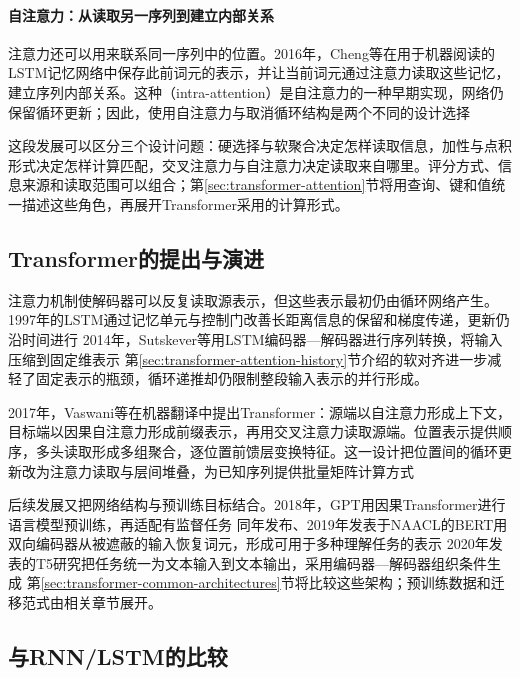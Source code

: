 \paragraph{自注意力：从读取另一序列到建立内部关系}
注意力还可以用来联系同一序列中的位置。2016年，Cheng等在用于机器阅读的LSTM记忆网络中保存此前词元的表示，并让当前词元通过注意力读取这些记忆，建立序列内部关系。这种（intra-attention）是自注意力的一种早期实现，网络仍保留循环更新；因此，使用自注意力与取消循环结构是两个不同的设计选择

这段发展可以区分三个设计问题：硬选择与软聚合决定怎样读取信息，加性与点积形式决定怎样计算匹配，交叉注意力与自注意力决定读取来自哪里。评分方式、信息来源和读取范围可以组合；第\ref{sec:transformer-attention}节将用查询、键和值统一描述这些角色，再展开Transformer采用的计算形式。

\subsection{Transformer的提出与演进}
\label{sec:transformer-architecture-history}

注意力机制使解码器可以反复读取源表示，但这些表示最初仍由循环网络产生。1997年的LSTM通过记忆单元与控制门改善长距离信息的保留和梯度传递，更新仍沿时间进行 2014年，Sutskever等用LSTM编码器—解码器进行序列转换，将输入压缩到固定维表示 第\ref{sec:transformer-attention-history}节介绍的软对齐进一步减轻了固定表示的瓶颈，循环递推却仍限制整段输入表示的并行形成。

2017年，Vaswani等在机器翻译中提出Transformer：源端以自注意力形成上下文，目标端以因果自注意力形成前缀表示，再用交叉注意力读取源端。位置表示提供顺序，多头读取形成多组聚合，逐位置前馈层变换特征。这一设计把位置间的循环更新改为注意力读取与层间堆叠，为已知序列提供批量矩阵计算方式

\Needspace{165mm}
后续发展又把网络结构与预训练目标结合。2018年，GPT用因果Transformer进行语言模型预训练，再适配有监督任务 同年发布、2019年发表于NAACL的BERT用双向编码器从被遮蔽的输入恢复词元，形成可用于多种理解任务的表示 2020年发表的T5研究把任务统一为文本输入到文本输出，采用编码器—解码器组织条件生成 第\ref{sec:transformer-common-architectures}节将比较这些架构；预训练数据和迁移范式由相关章节展开。

\subsection{与RNN/LSTM的比较}
\label{sec:transformer-recurrent-comparison}

